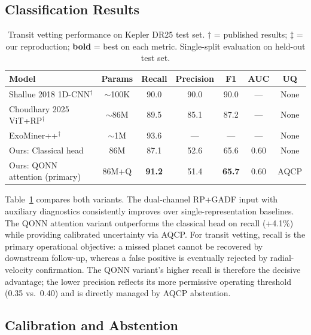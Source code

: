 \documentclass{article}
\begin{document}
\subsection{Classification Results}

\begin{table}[t]
  \centering
  \caption{Transit vetting performance on Kepler DR25 test set.
  $\dagger$ = published results; $\ddagger$ = our reproduction;
  \textbf{bold} = best on each metric.
  Single-split evaluation on held-out test set.}
  \label{tab:classification}
  \small
  \begin{tabular}{lcccccc}
    \toprule
    \textbf{Model} & \textbf{Params} & \textbf{Recall} & \textbf{Precision} & \textbf{F1} & \textbf{AUC} & \textbf{UQ} \\
    \midrule
    Shallue 2018 1D-CNN$^\dagger$          & $\sim$100K  & 90.0 & 90.0 & 90.0 & ---   & None \\
    Choudhary 2025 ViT+RP$^\dagger$        & $\sim$86M   & 89.5 & 85.1 & 87.2 & ---   & None \\
    ExoMiner++$^\dagger$                   & $\sim$1M    & 93.6 & ---  & ---  & ---   & None \\
    \midrule
    Ours: Classical head                   & 86M         & 87.1 & 52.6 & 65.6 & 0.60 & None \\
    Ours: QONN attention (primary)         & 86M+Q       & \textbf{91.2} & 51.4 & \textbf{65.7} & 0.60 & AQCP \\
    \bottomrule
  \end{tabular}
\end{table}

Table~\ref{tab:classification} compares both variants.
The dual-channel RP+GADF input with auxiliary diagnostics consistently
improves over single-representation baselines.
The QONN attention variant outperforms the classical head on
recall (+4.1\%) while providing calibrated uncertainty via AQCP.
For transit vetting, recall is the primary operational objective: a missed
planet cannot be recovered by downstream follow-up, whereas a false positive
is eventually rejected by radial-velocity confirmation.
The QONN variant's higher recall is therefore the decisive advantage; the
lower precision reflects its more permissive operating threshold (0.35 vs.\
0.40) and is directly managed by AQCP abstention.

\subsection{Calibration and Abstention}
\end{document}
